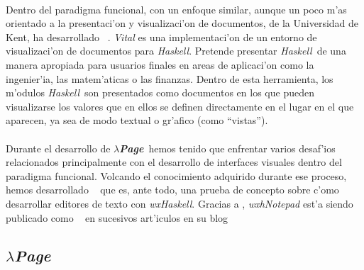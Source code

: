 \documentclass[a4paper]{article}
\newcommand{\haskell}{\textsl{Haskell}}
\newcommand{\hpage}{\textbf{\textsl{$\lambda$Page}}}
\begin{document}
\paragraph{}Dentro del paradigma funcional, con un enfoque similar, aunque un poco m'as orientado a la presentaci'on y visualizaci'on de documentos,  de la Universidad de Kent, ha desarrollado ~\cite{vital}.  \textsl{Vital} es una implementaci'on de un entorno de visualizaci'on de documentos para \haskell.  Pretende presentar \haskell\ de una manera apropiada para usuarios finales en areas de aplicaci'on como la ingenier'ia, las matem'aticas o las finanzas.  Dentro de esta herramienta, los m'odulos \haskell\ son presentados como documentos en los que pueden visualizarse los valores que en ellos se definen directamente en el lugar en el que aparecen, ya sea de modo textual o gr'afico (como ``vistas''). 
\paragraph{}Durante el desarrollo de \hpage\ hemos tenido que enfrentar varios desaf'ios relacionados principalmente con el desarrollo de interfaces visuales dentro del paradigma funcional.  Volcando el conocimiento adquirido durante ese proceso, hemos desarrollado ~\cite{wxhnotepad} que es, ante todo, una prueba de concepto sobre c'omo desarrollar editores de texto con \textsl{wxHaskell}.  Gracias a , \textsl{wxhNotepad} est'a siendo publicado como ~\cite{wewantarock} en sucesivos art'iculos en su blog
\subsection{\hpage}
\begin{epigraphs}
\end{epigraphs}
\end{document}
